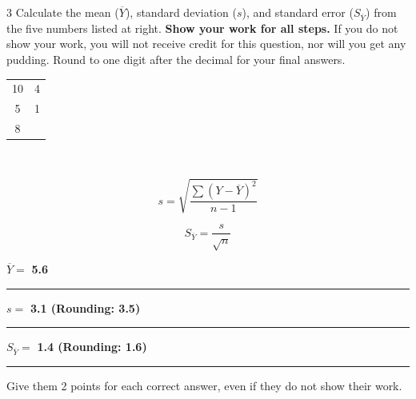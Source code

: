 \showpoints

\question[10]
\begin{multicols}{3}
Calculate the mean ($\overline{Y}$), standard deviation ($s$), and standard error ($S_{\overline{Y}}$) from the five numbers listed at right. \textbf{Show your work for all steps.} If you do not show your work, you will not receive credit for this question, nor will you get any pudding. Round to one digit after the decimal for your final answers.

\columnbreak

\hfill\begin{tabular}{@{}cc@{}}
\toprule
10	& 4\\
5	& 1\\
8	& \\
\bottomrule
\end{tabular}\hfill\

\[s = \sqrt{\frac{\sum{(Y-\overline{Y})^2}}{n-1}}\]

\[S_{\overline{Y}} = \dfrac{s}{\sqrt{n}}\]

\columnbreak

$\overline{Y}=$ \ifprintanswers\textbf{5.6}\else\rule{0.75in}{0.4pt}\fi

\vspace*{2\baselineskip}

 $s = $ \ifprintanswers\textbf{3.1 (Rounding: 3.5)}\else\rule{0.75in}{0.4pt}\fi

\vspace*{2\baselineskip}

$S_{\overline{Y}} = $ \ifprintanswers\textbf{1.4 (Rounding: 1.6)}\else\rule{0.75in}{0.4pt}\fi

\end{multicols}

\begin{solution}

Give them 2 points for each correct answer, even if they do not show their work. 

\end{solution}